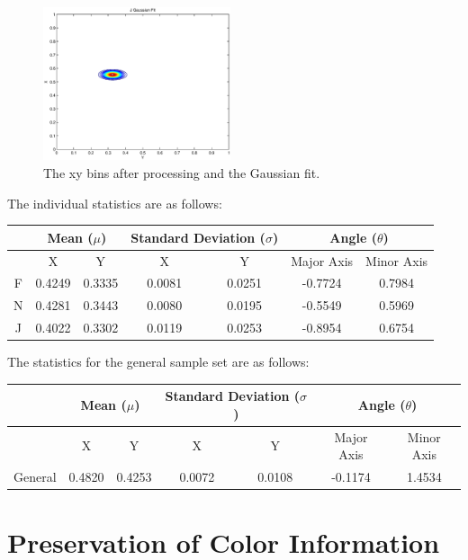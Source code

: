 \begin{figure}[h!]
    \includegraphics[width=0.49\textwidth]{Chapter2/Figs/JHands_XY_gFit.eps}
    \caption{The xy bins after processing and the Gaussian fit.}  \label{fig:FBinAndGFit}
\end{figure}

The individual statistics are as follows:
\newline

\begin{tabular}{|c|c|c|c|c|c|c|}
\hline
& \multicolumn{2}{|c|}{Mean ($\mu$)} & \multicolumn{2}{|c|}{Standard Deviation ($\sigma$)} & \multicolumn{2}{|c|}{Angle ($\theta$)} \\\hline
& X & Y & X & Y & Major Axis & Minor Axis \\\hline
F & 0.4249 & 0.3335 & 0.0081 & 0.0251 & -0.7724 & 0.7984 \\\hline
N & 0.4281 & 0.3443 & 0.0080 & 0.0195 & -0.5549 & 0.5969 \\\hline
J & 0.4022 & 0.3302 & 0.0119 & 0.0253 & -0.8954 & 0.6754 \\\hline
\end{tabular}
\newline
\vspace{0.5 cm}
\newline
The statistics for the general sample set are as follows:
\newline

\begin{tabular}{|c|c|c|c|c|c|c|}
\hline
& \multicolumn{2}{|c|}{Mean ($\mu$)} & \multicolumn{2}{|c|}{Standard Deviation ($\sigma$)} & \multicolumn{2}{|c|}{Angle ($\theta$)} \\\hline
& X & Y & X & Y & Major Axis & Minor Axis \\\hline
General & 0.4820 & 0.4253 & 0.0072 & 0.0108 & -0.1174 & 1.4534 \\\hline
\end{tabular}



\section{Preservation of Color Information}\label{sec:PreservationOfColorInformation}

